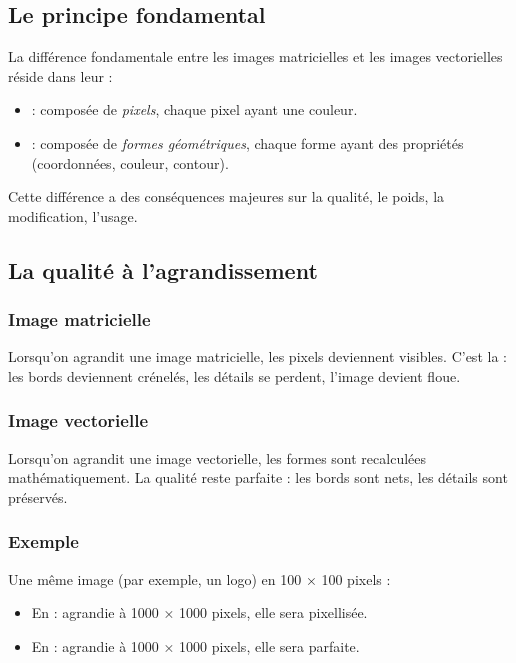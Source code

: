 \subsection{Le principe fondamental}

La différence fondamentale entre les images matricielles et les images vectorielles réside dans leur  :

\begin{itemize}
    \item {} : composée de \emph{pixels}, chaque pixel ayant une couleur.
    \item {} : composée de \emph{formes géométriques}, chaque forme ayant des propriétés (coordonnées, couleur, contour).
\end{itemize}

Cette différence a des conséquences majeures sur la qualité, le poids, la modification, l'usage.

\subsection{La qualité à l'agrandissement}

\subsubsection{Image matricielle}

Lorsqu'on agrandit une image matricielle, les pixels deviennent visibles. C'est la  : les bords deviennent crénelés, les détails se perdent, l'image devient floue.

\subsubsection{Image vectorielle}

Lorsqu'on agrandit une image vectorielle, les formes sont recalculées mathématiquement. La qualité reste parfaite : les bords sont nets, les détails sont préservés.

\subsubsection{Exemple}

Une même image (par exemple, un logo) en 100 × 100 pixels :

\begin{itemize}
    \item En  : agrandie à 1000 × 1000 pixels, elle sera pixellisée.
    \item En  : agrandie à 1000 × 1000 pixels, elle sera parfaite.
\end{itemize}

